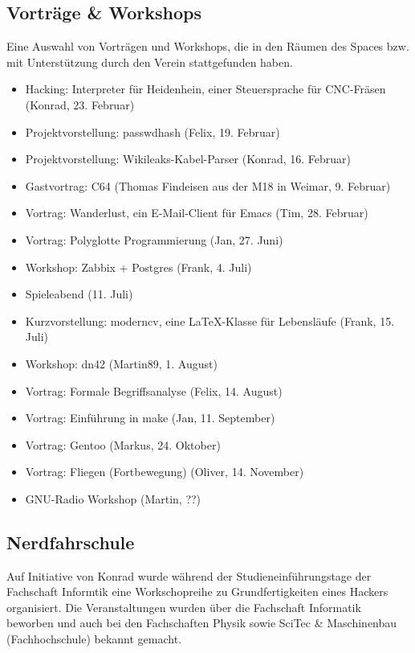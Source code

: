 \documentclass[10pt,DIV16]{scrartcl}
\begin{document}
\subsection{Vorträge \& Workshops}

Eine Auswahl von Vorträgen und Workshops, die in den Räumen des
Spaces bzw. mit Unterstützung durch den Verein stattgefunden haben.

\begin{itemize}
	\item Hacking:  Interpreter für Heidenhein, einer Steuersprache für CNC-Fräsen (Konrad, 23. Februar)
	\item Projektvorstellung:  passwdhash (Felix, 19. Februar)
	\item Projektvorstellung:  Wikileaks-Kabel-Parser (Konrad, 16. Februar)
	\item Gastvortrag:  C64 (Thomas Findeisen aus der M18 in Weimar, 9. Februar)
	\item Vortrag:  Wanderlust, ein E-Mail-Client für Emacs (Tim, 28. Februar)
	\item Vortrag: Polyglotte Programmierung  (Jan, 27. Juni)
	\item Workshop:  Zabbix + Postgres (Frank, 4. Juli)
	\item Spieleabend (11. Juli)
	\item Kurzvorstellung: moderncv, eine \LaTeX-Klasse für Lebensläufe (Frank, 15. Juli)
	\item Workshop:  dn42 (Martin89, 1. August)
	\item Vortrag:  Formale Begriffsanalyse (Felix, 14. August)
	\item Vortrag:  Einführung in make (Jan, 11. September)
	\item Vortrag:  Gentoo (Markus, 24. Oktober)
	\item Vortrag:  Fliegen (Fortbewegung) (Oliver, 14. November)
	\item GNU-Radio Workshop (Martin, ??)
\end{itemize}

\subsection{Nerdfahrschule}

Auf Initiative von Konrad wurde während der Studieneinführungstage der
Fachschaft Informtik eine Workschopreihe zu Grundfertigkeiten eines Hackers
organisiert.  Die Veranstaltungen wurden über die Fachschaft Informatik
beworben und auch bei den Fachschaften Physik sowie SciTec \& Maschinenbau
(Fachhochschule) bekannt gemacht.
\end{document}
